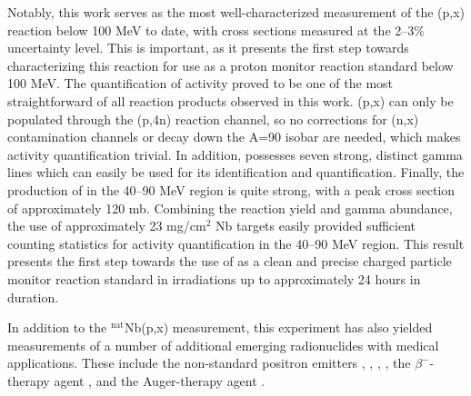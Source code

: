 \documentclass[%
 reprint,
superscriptaddress,
onecolumn,
linenumbers,
notitlepage,
 amsmath,amssymb,
 aps,
prc,
]{revtex4-1}
\begin{document}
Notably, this work serves as the most well-characterized measurement of the (p,x) reaction below 100 MeV to date, with cross sections measured  at the 2--3\% uncertainty level.
This is important, as it presents the first step towards characterizing this reaction for use as a proton monitor reaction standard below 100 MeV.
The quantification of  activity proved to be one of the most straightforward of all reaction products observed in this work.
(p,x) can only be populated through the (p,4n) reaction channel, so no corrections for (n,x) contamination channels or decay down the A=90 isobar are needed, which makes activity quantification trivial.
In addition,   possesses seven strong, distinct gamma lines which can easily  be used for its identification and quantification.
Finally, the production of   in the 40--90 MeV region is quite strong, with a peak cross section of approximately 120 mb.
Combining the reaction yield and gamma abundance, the use of approximately 23 mg/cm$^2$ Nb targets easily provided sufficient counting statistics for activity quantification in the 40--90 MeV region.
This result presents the first step towards the use of  as a clean and precise   charged particle monitor reaction standard in irradiations up to approximately 24 hours in duration.





In addition to the $^\text{nat}$Nb(p,x) measurement, this experiment has also yielded measurements of  a number of additional  emerging radionuclides with medical applications.
These include the non-standard positron emitters ,  , ,  , the $\beta^-$-therapy agent  ,  and the Auger-therapy agent . 
\end{document}
